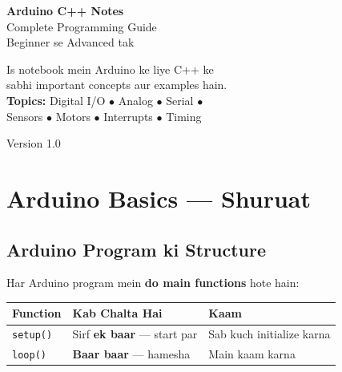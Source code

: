 \documentclass[12pt,a4paper]{article}
\begin{document}

\begin{titlepage}
  \centering
  \vspace*{2cm}
  
  {\Huge\bfseries\sffamily\color{arduinoBlue} Arduino C++ Notes}\\[0.5cm]
  {\Large\sffamily\color{arduinoTeal} Complete Programming Guide}\\[0.3cm]
  {\large\sffamily\color{gray} Beginner se Advanced tak}\\[2cm]
  
  \begin{tcolorbox}[colback=arduinoBlue!10, colframe=arduinoBlue, width=0.8\textwidth]
    \centering
    \large\sffamily
    Is notebook mein Arduino ke liye C++ ke\\
    sabhi important concepts aur examples hain.\\[0.3cm]
    \textbf{Topics:} Digital I/O $\bullet$ Analog $\bullet$ Serial $\bullet$\\
    Sensors $\bullet$ Motors $\bullet$ Interrupts $\bullet$ Timing
  \end{tcolorbox}
  
  \vfill
  {\large\sffamily\color{gray} Version 1.0}
\end{titlepage}

\tableofcontents
\newpage

\section{Arduino Basics — Shuruat}

\subsection{Arduino Program ki Structure}

Har Arduino program mein \textbf{do main functions} hote hain:

\begin{center}
\begin{tabular}{|l|l|l|}
\hline
\rowcolor{arduinoBlue!20}
\textbf{Function} & \textbf{Kab Chalta Hai} & \textbf{Kaam} \\
\hline
\texttt{setup()} & Sirf \textbf{ek baar} — start par & Sab kuch initialize karna \\
\hline
\texttt{loop()} & \textbf{Baar baar} — hamesha & Main kaam karna \\
\hline
\end{tabular}
\end{center}
\end{document}
